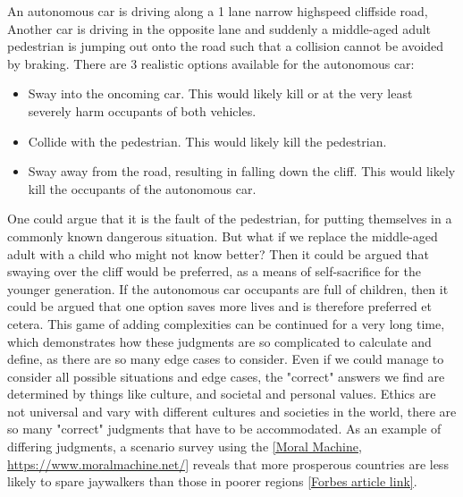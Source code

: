 An autonomous car is driving along a 1 lane narrow highspeed cliffside road, Another car is driving in the opposite lane and suddenly a middle-aged adult pedestrian is jumping out onto the road such that a collision cannot be avoided by braking.
There are 3 realistic options available for the autonomous car:
\begin{itemize}
    \item Sway into the oncoming car. This would likely kill or at the very least severely harm occupants of both vehicles.
    \item Collide with the pedestrian. This would likely kill the pedestrian.
    \item Sway away from the road, resulting in falling down the cliff. This would likely kill the occupants of the autonomous car.
\end{itemize}
One could argue that it is the fault of the pedestrian, for putting themselves in a commonly known dangerous situation. 
But what if we replace the middle-aged adult with a child who might not know better? 
Then it could be argued that swaying over the cliff would be preferred, as a means of self-sacrifice for the younger generation.
If the autonomous car occupants are full of children, then it could be argued that one option saves more lives and is therefore preferred et cetera.
This game of adding complexities can be continued for a very long time, which demonstrates how these judgments are so complicated to calculate and define, as there are so many edge cases to consider.
Even if we could manage to consider all possible situations and edge cases, the "correct" answers we find are determined by things like culture, and societal and personal values.
Ethics are not universal and vary with different cultures and societies in the world, there are so many "correct" judgments that have to be accommodated.
As an example of differing judgments, a scenario survey using the \href{https://www.moralmachine.net/}{[Moral Machine, https://www.moralmachine.net/]} reveals that more prosperous countries are less likely to spare jaywalkers than those in poorer regions \href{https://www.forbes.com/sites/jamesmorris/2021/02/13/self-driving-cars-wont-go-mainstream-until-we-solve-this-problem/?sh=2fba5092f3b3}{[Forbes article link]}.
